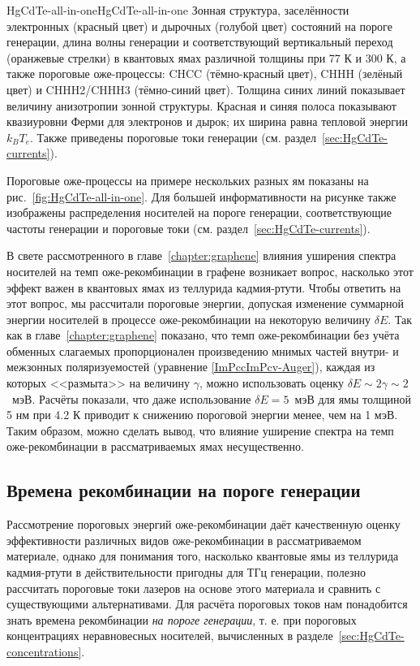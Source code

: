 \begin{fig}{HgCdTe-all-in-one}{HgCdTe-all-in-one} Зонная структура, заселённости электронных (красный цвет) и дырочных (голубой цвет) состояний на пороге генерации, длина волны генерации и соответствующий вертикальный переход (оранжевые стрелки) в квантовых ямах \HgCdTe{} различной толщины при 77 К и 300 К, а также пороговые оже-процессы: CHCC (тёмно-красный цвет), CHHH (зелёный цвет) и CHHH2/CHHH3 (тёмно-синий цвет). Толщина синих линий показывает величину анизотропии зонной структуры. Красная и синяя полоса показывают квазиуровни Ферми для электронов и дырок; их ширина равна тепловой энергии $k_B T_e$. Также приведены пороговые токи генерации (см. раздел~\ref{sec:HgCdTe-currents}).
\end{fig}

Пороговые оже-процессы на примере нескольких разных ям показаны на рис.~\ref{fig:HgCdTe-all-in-one}. Для большей информативности на рисунке также изображены распределения носителей на пороге генерации, соответствующие частоты генерации и пороговые токи (см. раздел~\ref{sec:HgCdTe-currents}).

В свете рассмотренного в главе~\ref{chapter:graphene} влияния уширения спектра носителей на темп оже-рекомбинации в графене возникает вопрос, насколько этот эффект важен в квантовых ямах из теллурида кадмия-ртути. Чтобы ответить на этот вопрос, мы рассчитали пороговые энергии, допуская изменение суммарной энергии носителей в процессе оже-рекомбинации на некоторую величину $\delta E$. Так как в главе~\ref{chapter:graphene} показано, что темп оже-рекомбинации без учёта обменных слагаемых пропорционален произведению мнимых частей внутри- и межзонных поляризуемостей (уравнение \eqref{ImPccImPcv-Auger}), каждая из которых <<размыта>> на величину $\gamma$, можно использовать оценку $\delta E \sim 2 \gamma \sim 2$~мэВ. Расчёты показали, что даже использование $\delta E = 5$~мэВ для ямы толщиной 5 нм при 4.2 К приводит к снижению пороговой энергии менее, чем на 1 мэВ. Таким образом, можно сделать вывод, что влияние уширение спектра на темп оже-рекомбинации в рассматриваемых ямах несущественно.

\subsection{Времена рекомбинации на пороге генерации} \label{sec:HgCdTe-times}
Рассмотрение пороговых энергий оже-рекомбинации даёт качественную оценку эффективности различных видов оже-рекомбинации в рассматриваемом материале, однако для понимания того, насколько квантовые ямы из теллурида кадмия-ртути в действительности пригодны для ТГц генерации, полезно рассчитать пороговые токи лазеров на основе этого материала и сравнить с существующими альтернативами. Для расчёта пороговых токов нам понадобится знать времена рекомбинации \emph{на пороге генерации}, т. е. при пороговых концентрациях неравновесных носителей, вычисленных в разделе~\ref{sec:HgCdTe-concentrations}.

